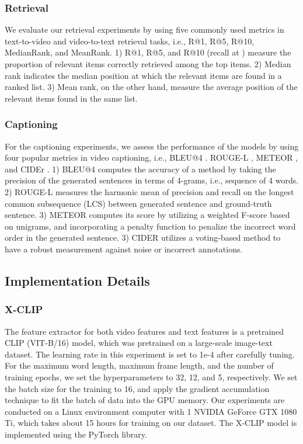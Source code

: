 \documentclass{article}
\begin{document}
\subsubsection{Retrieval}
We evaluate our retrieval experiments by using five commonly used metrics in text-to-video and video-to-text retrieval tasks, i.e., R@1, R@5, R@10, MedianRank, and MeanRank. 1) R@1, R@5, and R@10 (recall at ) measure the proportion of relevant items correctly retrieved among the top  items. 2) Median rank indicates the median position at which the relevant items are found in a ranked list. 3) Mean rank, on the other hand, measure the average position of the relevant items found in the same list.

\subsubsection{Captioning}
For the captioning experiments, we assess the performance of the models by using four popular metrics in video captioning, i.e., BLEU@4 \cite{10.3115/1073083.1073135}. ROUGE-L \cite{lin2004rouge}, METEOR \cite{banarjee2005}, and CIDEr \cite{7299087}. 1) BLEU@4 computes the accuracy of a method by taking the precision of the generated sentences in terms of 4-grams, i.e., sequence of 4 words. 2) ROUGE-L measures the harmonic mean of precision and recall on the longest common subsequence (LCS) between generated sentence and ground-truth sentence.  3) METEOR computes its score by utilizing a weighted F-score based on unigrams, and incorporating a penalty function to penalize the incorrect word order in the generated sentence. 3) CIDER utilizes a voting-based method to have a robust measurement against noise or incorrect annotations.


\subsection{Implementation Details}
\subsubsection{X-CLIP}
The feature extractor for both video features and text features is a pretrained CLIP (VIT-B/16) \cite{Radford2021LearningTV} model, which was pretrained on a large-scale image-text dataset. The learning rate in this experiment is set to 1e-4 after carefully tuning. For the maximum word length, maximum frame length, and the number of training epochs, we set the hyperparameters to 32, 12, and 5, respectively. We set the batch size for the training to 16, and apply the gradient accumulation technique to fit the batch of data into the GPU memory. Our experiments are conducted on a Linux environment computer with 1 NVIDIA GeForce GTX 1080 Ti, which takes about 15 hours for training on our dataset. The X-CLIP model is implemented using the PyTorch library.
\end{document}
